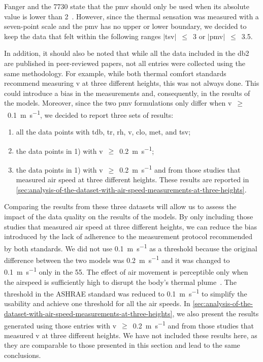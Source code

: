 Fanger and the \gls{7730} state that the \ac{pmv} should only be used when its absolute value is lower than 2~\cite{Fanger1970, iso7730}.
However, since the thermal sensation was measured with a seven-point scale and the \ac{pmv} has no upper or lower boundary, we decided to keep the data that felt within the following ranges $|$\ac{tsv}$|$~$\leq$~\num{3} or $|$\ac{pmv}$|$~$\leq$~\num{3.5}.

In addition, it should also be noted that while all the data included in the \ac{db2} are published in peer-reviewed papers, not all entries were collected using the same methodology.
For example, while both thermal comfort standards recommend measuring \ac{v} at three different heights, this was not always done.
This could introduce a bias in the measurements and, consequently, in the results of the models.
Moreover, since the two \ac{pmv} formulations only differ when \ac{v}~$\geq$~\qty{0.1}{\m\per\s}, we decided to report three sets of results:
\begin{enumerate}[ {}1{)} ]
    \item all the data points with \ac{tdb}, \ac{tr}, \ac{rh}, \ac{v}, \ac{clo}, \ac{met}, and \ac{tsv};
    \item the data points in 1) with \ac{v}~$\geq$~\qty{0.2}{\m\per\s};
    \item the data points in 1) with \ac{v}~$\geq$~\qty{0.2}{\m\per\s} and from those studies that measured air speed at three different heights.
    These results are reported in \ref{sec:analysis-of-the-dataset-with-air-speed-measurements-at-three-heights}.
\end{enumerate}
Comparing the results from these three datasets will allow us to assess the impact of the data quality on the results of the models.
By only including those studies that measured air speed at three different heights, we can reduce the bias introduced by the lack of adherence to the measurement protocol recommended by both standards.
We did not use \qty{0.1}{\m\per\s} as a threshold because the original difference between the two models was \qty{0.2}{\m\per\s} and it was changed to \qty{0.1}{\m\per\s} only in the \gls{55}.
The effect of air movement is perceptible only when the airspeed is sufficiently high to disrupt the body's thermal plume~\cite{zukowska_impact_2012}.
The threshold in the ASHRAE standard was reduced to \qty{0.1}{\m\per\s} to simplify the usability and achieve one threshold for all the air speeds.
In \ref{sec:analysis-of-the-dataset-with-air-speed-measurements-at-three-heights}, we also present the results generated using those entries with \ac{v}~$\geq$~\qty{0.2}{\m\per\s} and from those studies that measured \ac{v} at three different heights.
We have not included these results here, as they are comparable to those presented in this section and lead to the same conclusions.

